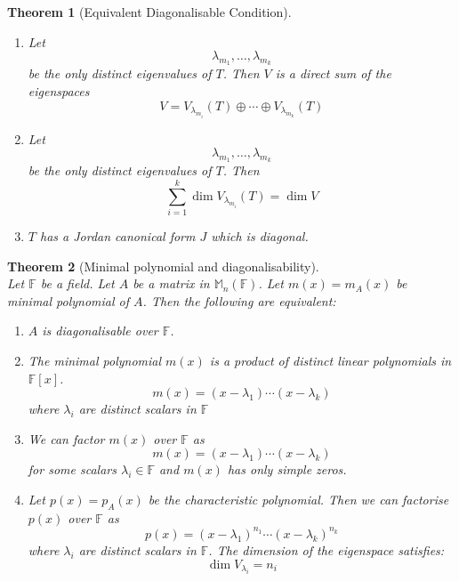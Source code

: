 \documentclass[12pt]{article}
\newtheorem{theorem}{Theorem}[section]
\theoremstyle{definition}
\begin{document}
\begin{theorem}[Equivalent Diagonalisable Condition]
\begin{enumerate}
\[\begin{pmatrix}
0&0&\lambda_{m_3}I_{|B_3|}&\cdots&0\\
\vdots&\vdots&\vdots&\ddots&\vdots\\
0&0&0&\cdots&\lambda_{m_k}I_{|B_k|}
\end{pmatrix}
\]
\item Let \[
\lambda_{m_1},\ldots,\lambda_{m_k}
\]
be the only distinct eigenvalues of $T$. Then $V$ is a direct sum of the eigenspaces
\[
V=V_{\lambda_{m_i}}(T)\oplus\cdots\oplus V_{\lambda_{m_k}}(T)
\]
\item  Let \[
\lambda_{m_1},\ldots,\lambda_{m_k}
\]
be the only distinct eigenvalues of $T$. Then
\[
\sum_{i=1}^k\dim V_{\lambda_{m_i}}(T)=\dim V
\]
\item $T$ has a Jordan canonical form $J$ which is diagonal.
\end{enumerate}
\end{theorem}
\begin{theorem}[Minimal polynomial and diagonalisability]
\hfill\\\normalfont Let $\mathbb{F}$ be a field. Let $A$ be a matrix in $\mathbb{M}_n(\mathbb{F})$. Let $m(x)=m_A(x)$ be minimal polynomial of $A$. Then the following are equivalent:
\begin{enumerate}[label=(\arabic*)]
\item $A$ is diagonalisable over $\mathbb{F}$.
\item The minimal polynomial $m(x)$ is a product of distinct linear polynomials in $\mathbb{F}[x]$.
\[
m(x)=(x-\lambda_1)\cdots(x-\lambda_k)
\]
where $\lambda_i$ are distinct scalars in $\mathbb{F}$
\item We can factor $m(x)$ over $\mathbb{F}$ as
\[
m(x)=(x-\lambda_1)\cdots(x-\lambda_k)
\]
for some scalars $\lambda_i\in\mathbb{F}$ and $m(x)$ has only simple zeros.
\item Let $p(x)=p_A(x)$ be the characteristic polynomial. Then we can factorise $p(x)$ over $\mathbb{F}$ as
\[
p(x)=(x-\lambda_1)^{n_1}\cdots(x-\lambda_k)^{n_k}
\]
where $\lambda_i$ are distinct scalars in $\mathbb{F}$. The dimension of the eigenspace satisfies:
\[
\dim V_{\lambda_i}=n_i
\]
\end{enumerate}
\end{theorem}
\end{document}
